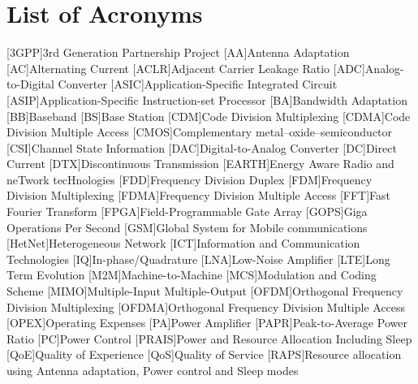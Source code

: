 \chapter{List of Acronyms}
\begin{acronym}[WINNER]

[3GPP]{3rd Generation Partnership Project} %
[AA]{Antenna Adaptation}
[AC]{Alternating Current}
[ACLR]{Adjacent Carrier Leakage Ratio}  %
[ADC]{Analog-to-Digital Converter}  %
[ASIC]{Application-Specific Integrated Circuit}  %
[ASIP]{Application-Specific Instruction-set Processor}  %
[BA]{Bandwidth Adaptation} 
[BB]{Baseband} 
[BS]{Base Station}
[CDM]{Code Division Multiplexing}  %
[CDMA]{Code Division Multiple Access}  %
[CMOS]{Complementary metal–oxide–semiconductor}  %
[CSI]{Channel State Information}
[DAC]{Digital-to-Analog Converter}  %
[DC]{Direct Current}
[DTX]{Discontinuous Transmission}
[EARTH]{Energy Aware Radio and neTwork tecHnologies}
[FDD]{Frequency Division Duplex}
[FDM]{Frequency Division Multiplexing}  %
[FDMA]{Frequency Division Multiple Access}
[FFT]{Fast Fourier Transform}  %
[FPGA]{Field-Programmable Gate Array}  %
[GOPS]{Giga Operations Per Second}  %
[GSM]{Global System for Mobile communications} 
[HetNet]{Heterogeneous Network}
[ICT]{Information and Communication Technologies}  %
[IQ]{In-phase/Quadrature} %
[LNA]{Low-Noise Amplifier}  %
[LTE]{Long Term Evolution}
[M2M]{Machine-to-Machine} %
[MCS]{Modulation and Coding Scheme} %
[MIMO]{Multiple-Input Multiple-Output}
[OFDM]{Orthogonal Frequency Division Multiplexing}
[OFDMA]{Orthogonal Frequency Division Multiple Access}
[OPEX]{Operating Expenses} %
[PA]{Power Amplifier}
[PAPR]{Peak-to-Average Power Ratio} %
[PC]{Power Control}
[PRAIS]{Power and Resource Allocation Including Sleep}
[QoE]{Quality of Experience} %
[QoS]{Quality of Service} %
[RAPS]{Resource allocation using Antenna adaptation, Power control and Sleep modes}

\end{acronym}
